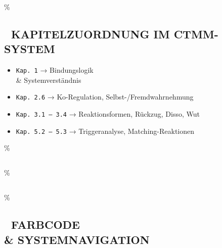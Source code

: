\hypertarget{kapitelzuordnung-im-ctmm-system}{\%
\subsection{\texorpdfstring{📘 \textbf{KAPITELZUORDNUNG IM CTMM-SYSTEM}}{📘 KAPITELZUORDNUNG IM CTMM-SYSTEM}}\label{kapitelzuordnung-im-ctmm-system}}

\begin{itemize}
\tightlist
\item
  \texttt{Kap.\ }\texttt{1} → Bindungslogik \\& Systemverständnis
\item
  \texttt{Kap.\ }\texttt{2.6} → Ko-Regulation, Selbst-/Fremdwahrnehmung
\item
  \texttt{Kap.\ }\texttt{3.1\ –\ 3.4} → Reaktionsformen, Rückzug, Disso, Wut
\item
  \texttt{Kap.\ }\texttt{5.2\ –\ 5.3} → Triggeranalyse, Matching-Reaktionen
\end{itemize}

\hypertarget{section}{\%
\subsection{}\label{section}}

\hypertarget{section-1}{\%
\subsection{}\label{section-1}}

\hypertarget{farbcode-systemnavigation}{\%
\subsection{\texorpdfstring{\textbf{🎨 FARBCODE \\& SYSTEMNAVIGATION}}{🎨 FARBCODE \\& SYSTEMNAVIGATION}}\label{farbcode-systemnavigation}}

